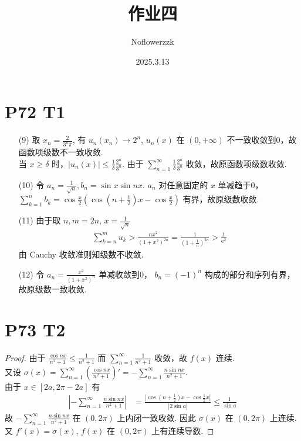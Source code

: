 \documentclass{article}
\title{作业四}
\author{Noflowerzzk}
\date{2025.3.13}
\begin{document}
\maketitle

\section*{P72 T1}

\begin{itemize}
    \item [(9)] 取 $x_n = \frac{2}{3^n\pi}$, 有 $u_n(x_n) \to 2^n$, $u_n(x)$ 在 $(0, +\infty)$ 不一致收敛到0，故函数项级数不一致收敛. \\
    当 $x \geq \delta$ 时，$\left\lvert u_n(x)\right\rvert \leq \frac{1}{\delta}\frac{2^n}{3^n}$. 由于 $\sum_{n = 1}^{\infty} \frac{1}{\delta}\frac{2^n}{3^n}$ 收敛，故原函数项级数收敛.
    \item [(10)] 令 $a_n = \frac{1}{\sqrt{n}}, b_n = \sin x \sin nx$. $a_n$ 对任意固定的 $x$ 单减趋于0， $\sum_{k = 1}^{n}b_k = \cos \frac{x}{2} \left(\cos \left(n + \frac{1}{2}\right)x - \cos \frac{x}{2}\right)$ 有界，故原级数收敛.
    \item [(11)] 由于取 $n, m = 2n$, $x = \frac{1}{\sqrt{n}}$
    \begin{align*}
        \sum_{k = n}^{m}u_k > \frac{nx^2}{(1 + x^2)^{2n}} = \frac{1}{\left(1 + \frac{1}{n}\right)^{2n}} > \frac{1}{\mathrm{e}^2}
    \end{align*}
    由 Cauchy 收敛准则知级数不收敛.
    \item [(12)] 令 $a_n = \frac{x^2}{(1 + x^2)^n}$ 单减收敛到0， $b_n = (-1)^n$ 构成的部分和序列有界，故原级数一致收敛.
\end{itemize}

\section*{P73 T2}

\begin{proof}
    由于 $\frac{\cos nx}{n^2 + 1} \leq \frac{1}{n^2 + 1}$ 而 $\sum_{n = 1}^{\infty}\frac{1}{n^2 + 1}$ 收敛，故 $f(x)$ 连续. \\
    又设 $\sigma(x) = \sum_{n = 1}^{\infty}\left(\frac{\cos nx}{n^2 + 1}\right)' = -\sum_{n = 1}^{\infty}\frac{n\sin nx}{n^2 + 1}$. \\
    由于 $x \in [2a, 2\pi - 2a]$ 有 
    \begin{align*}
        \left\lvert -\sum_{n = 1}^{\infty}\frac{n\sin nx}{n^2 + 1}\right\rvert &= \frac{\left\lvert \cos \left(n + \frac{1}{2}\right)x - \cos \frac{1}{2}x\right\rvert }{\left\lvert 2\sin a\right\rvert } \leq \frac{1}{\sin a}
    \end{align*}
    故 $-\sum_{n = 1}^{\infty}\frac{n\sin nx}{n^2 + 1}$ 在 $(0, 2\pi)$ 上内闭一致收敛. 因此 $\sigma(x)$ 在 $(0, 2\pi)$ 上连续. 又 $f'(x) = \sigma(x)$, $f(x)$ 在 $(0, 2\pi)$ 上有连续导数.
\end{proof}
\end{document}
